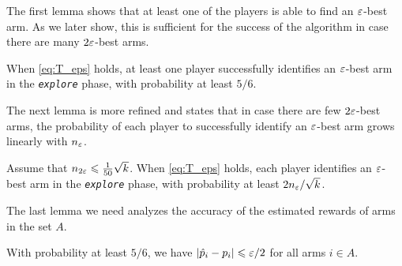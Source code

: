 The first lemma shows that at least one of the players is able to find an $\varepsilon$-best arm. As we later show, this is sufficient for the success of the algorithm in case there are many $2\varepsilon$-best arms.


\begin{lemma} \label{lem:kexplore_eps2}
When \eqref{eq:T_eps} holds, at least one player successfully identifies an $\varepsilon$-best arm in the \emph{\texttt{explore}} phase, with probability at least $5/6$.
\end{lemma}


The next lemma is more refined and states that in case there are few $2\varepsilon$-best arms, the probability of each player to successfully identify an $\varepsilon$-best arm grows linearly with $n_\varepsilon$.


\begin{lemma} \label{lem:kexplore_eps1}
Assume that $n_{2\varepsilon} \leqslant \tfrac{1}{50}\sqrt{k}$. When \eqref{eq:T_eps} holds, each player identifies an $\varepsilon$-best arm in the \emph{\texttt{explore}} phase, with probability at least $2 n_\varepsilon / \sqrt{k}$.
\end{lemma}



The last lemma we need analyzes the accuracy of the estimated rewards of arms in
the set $A$. %

\begin{lemma} \label{lem:estimates_eps}
With probability at least $5/6$, we have $|\hat{p}_i - p_i| \leqslant \varepsilon/2$ for all arms $i \in A$.
\end{lemma}




